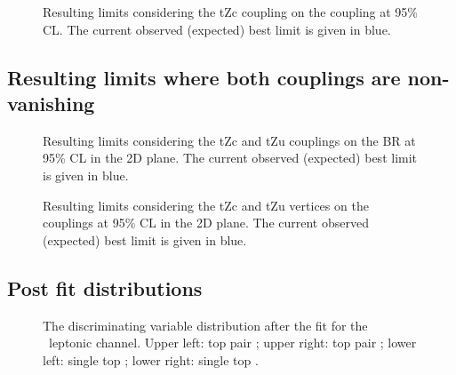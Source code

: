 \begin{figure}[ht]
	\centering
	\caption{Resulting limits considering the tZc coupling on the coupling at 95\%  CL. The current observed (expected) best limit is given in blue.}
	\label{fig:exclusionlimitbrfcnczctc}
\end{figure}




\subsection{Resulting limits where both couplings are non-vanishing}
\begin{figure}[ht]
	\centering
	\caption{Resulting limits considering the tZc and tZu couplings on the BR at 95\%  CL in the 2D plane. The current observed (expected) best limit is given in blue.}
	\label{fig:exclusionlimitbrfcnc}
\end{figure}

\begin{figure}[ht]
	\centering
	\caption{Resulting limits considering the tZc and tZu vertices on the couplings at 95\%  CL in the 2D plane. The current observed (expected) best limit is given in blue.}
	\label{fig:exclusionlimitbrfcncc}
\end{figure}
\subsection{Post fit distributions}
\begin{figure}[h]
	\centering
	\caption{The discriminating variable distribution after the fit for the \mumumu\ leptonic channel. Upper left: top pair \Zut; upper right: top pair \Zct; lower left: single top \Zut; lower right: single top \Zct.}
	\label{fig:shapesfitslepchan3mustcrerrortrialSTSR}
\end{figure}

